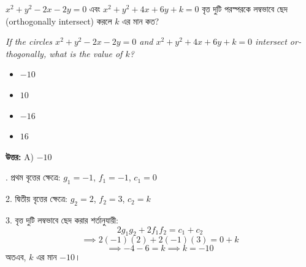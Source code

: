\documentclass[12pt, a4paper]{article}
\begin{document}
\begin{tcolorbox}[questionbox={প্রশ্ন (Question) 23}]
    \noindent
    $x^2 + y^2 - 2x - 2y = 0$ এবং $x^2 + y^2 + 4x + 6y + k = 0$ বৃত্ত দুটি পরস্পরকে লম্বভাবে ছেদ (orthogonally intersect) করলে $k$ এর মান কত?
    
    \vspace{0.8em}
    \begin{english}
    \noindent\textit{\color{darkgray}
    If the circles $x^2 + y^2 - 2x - 2y = 0$ and $x^2 + y^2 + 4x + 6y + k = 0$ intersect orthogonally, what is the value of $k$?
    }
    \end{english}
\end{tcolorbox}

\begin{itemize}[label={}, leftmargin=1cm, itemsep=0.5em]
    \item[\textbf{A)}] $-10$
    \item[\textbf{B)}] $10$
    \item[\textbf{C)}] $-16$
    \item[\textbf{D)}] $16$
\end{itemize}

\vspace{0.5em}
\begin{tcolorbox}[answerbox]
    \textbf{\color{success} উত্তর:} A) $-10$
\end{tcolorbox}
\vspace{1em}

\begin{tcolorbox}[solutionbox={সমাধান (Solution)}]
    . প্রথম বৃত্তের ক্ষেত্রে: $g_1 = -1$, $f_1 = -1$, $c_1 = 0$
    
    2. দ্বিতীয় বৃত্তের ক্ষেত্রে: $g_2 = 2$, $f_2 = 3$, $c_2 = k$
    
    \vspace{0.5em}
    3. বৃত্ত দুটি লম্বভাবে ছেদ করার শর্তানুযায়ী:
    \[ 2g_1g_2 + 2f_1f_2 = c_1 + c_2 \]
    \[ \implies 2(-1)(2) + 2(-1)(3) = 0 + k \]
    \[ \implies -4 - 6 = k \implies k = -10 \]
    অতএব, $k$ এর মান $-10$।
\end{tcolorbox}
\end{document}
